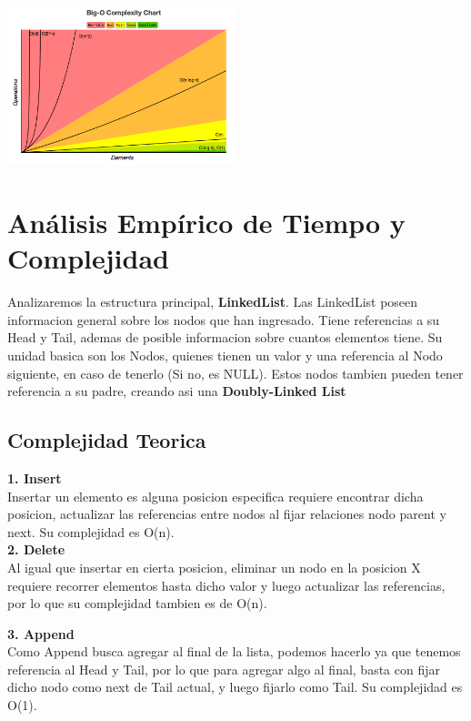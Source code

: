 \documentclass[12pt]{article}
\begin{document}
\vspace{0.2cm}
\begin{center}
	\includegraphics[width=0.5\textwidth]{img/Complex.png}
\end{center}



\section*{Análisis Empírico de Tiempo y Complejidad}

Analizaremos la estructura principal, \textbf{LinkedList}.
Las LinkedList poseen informacion general sobre los nodos que han ingresado. Tiene referencias a su Head y Tail, ademas de posible informacion sobre cuantos elementos tiene. Su unidad basica son los Nodos, quienes tienen un valor y una referencia al Nodo siguiente, en caso de tenerlo (Si no, es NULL). Estos nodos tambien pueden tener referencia a su padre, creando asi una \textbf{Doubly-Linked List}

\subsection*{Complejidad Teorica}
\vspace{0.2cm}

\textbf{1. Insert \\} 
Insertar un elemento es alguna posicion especifica requiere encontrar dicha posicion, actualizar las referencias entre nodos al fijar relaciones nodo parent y next.
Su complejidad es O(n).\\

\textbf{2. Delete \\} 
Al igual que insertar en cierta posicion, eliminar un nodo en la posicion X requiere recorrer elementos hasta dicho valor y luego actualizar las referencias, por lo que su complejidad tambien es de O(n).

\textbf{3. Append \\} 
Como Append busca agregar al final de la lista, podemos hacerlo  ya que tenemos referencia al Head y Tail, por lo que para agregar algo al final, basta con fijar dicho nodo como next de Tail actual, y luego fijarlo como Tail. Su complejidad es O(1).
\end{document}
